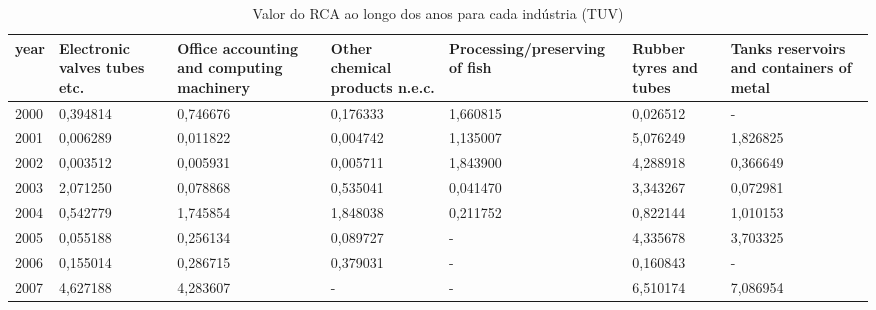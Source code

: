 \begin{table}
\centering
\caption{Valor do RCA ao longo dos anos para cada indústria (TUV)}
\begin{tabular}{p{1cm}p{2cm}p{2cm}p{2cm}p{2cm}p{2cm}p{2cm}}
\toprule
 year &  Electronic valves tubes etc. &  Office accounting and computing machinery &  Other chemical products n.e.c. &  Processing/preserving of fish &  Rubber tyres and tubes &  Tanks reservoirs and containers of metal \\
\midrule
 2000 &                      0,394814 &                                   0,746676 &                        0,176333 &                       1,660815 &                0,026512 &                                         - \\
 2001 &                      0,006289 &                                   0,011822 &                        0,004742 &                       1,135007 &                5,076249 &                                  1,826825 \\
 2002 &                      0,003512 &                                   0,005931 &                        0,005711 &                       1,843900 &                4,288918 &                                  0,366649 \\
 2003 &                      2,071250 &                                   0,078868 &                        0,535041 &                       0,041470 &                3,343267 &                                  0,072981 \\
 2004 &                      0,542779 &                                   1,745854 &                        1,848038 &                       0,211752 &                0,822144 &                                  1,010153 \\
 2005 &                      0,055188 &                                   0,256134 &                        0,089727 &                              - &                4,335678 &                                  3,703325 \\
 2006 &                      0,155014 &                                   0,286715 &                        0,379031 &                              - &                0,160843 &                                         - \\
 2007 &                      4,627188 &                                   4,283607 &                               - &                              - &                6,510174 &                                  7,086954 \\

\end{tabular}
\end{table}
